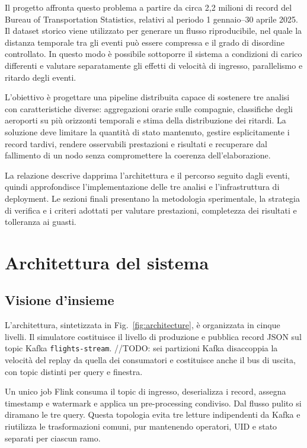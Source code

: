 \documentclass[conference]{IEEEtran}
\begin{document}
Il progetto affronta questo problema a partire da circa 2,2 milioni di record del Bureau of Transportation Statistics, relativi al periodo 1 gennaio--30 aprile 2025.
Il dataset storico viene utilizzato per generare un flusso riproducibile, nel quale la distanza temporale tra gli eventi può essere compressa e il grado di disordine controllato.
In questo modo è possibile sottoporre il sistema a condizioni di carico differenti e valutare separatamente gli effetti di velocità di ingresso, parallelismo e ritardo degli eventi.

L'obiettivo è progettare una pipeline distribuita capace di sostenere tre analisi con caratteristiche diverse: aggregazioni orarie sulle compagnie, classifiche degli aeroporti su più orizzonti temporali e stima della distribuzione dei ritardi.
La soluzione deve limitare la quantità di stato mantenuto, gestire esplicitamente i record tardivi, rendere osservabili prestazioni e risultati e recuperare dal fallimento di un nodo senza compromettere la coerenza dell'elaborazione.

La relazione descrive dapprima l'architettura e il percorso seguito dagli eventi, quindi approfondisce l'implementazione delle tre analisi e l'infrastruttura di deployment.
Le sezioni finali presentano la metodologia sperimentale, la strategia di verifica e i criteri adottati per valutare prestazioni, completezza dei risultati e tolleranza ai guasti.

\section{Architettura del sistema}\label{sec:system_architecture}
\subsection{Visione d'insieme}
L'architettura, sintetizzata in Fig.~\ref{fig:architecture}, è organizzata in cinque livelli.
Il simulatore costituisce il livello di produzione e pubblica record JSON sul topic Kafka \texttt{flights-stream}. //TODO: sei partizioni
Kafka disaccoppia la velocità del replay da quella dei consumatori e costituisce anche il bus di uscita, con topic distinti per query e finestra.

Un unico job Flink consuma il topic di ingresso, deserializza i record, assegna timestamp e watermark e applica un pre-processing condiviso.
Dal flusso pulito si diramano le tre query.
Questa topologia evita tre letture indipendenti da Kafka e riutilizza le trasformazioni comuni, pur mantenendo operatori, UID e stato separati per ciascun ramo.
\end{document}
